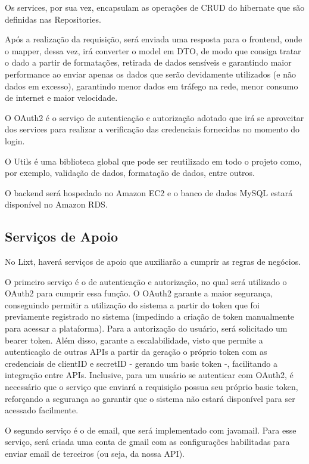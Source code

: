 Os services, por sua vez, encapsulam as operações de CRUD do hibernate que são definidas nas Repositories.

Após a realização da requisição, será enviada uma resposta para o frontend, onde o mapper, dessa vez, irá converter o model em DTO, de modo que consiga tratar o dado a partir de formatações, retirada de dados sensíveis e garantindo maior performance ao enviar apenas os dados que serão devidamente utilizados (e não dados em excesso), garantindo menor dados em tráfego na rede, menor consumo de internet e maior velocidade.

O OAuth2 é o serviço de autenticação e autorização adotado que irá se aproveitar dos services para realizar a verificação das credenciais fornecidas no momento do login.

O Utils é uma biblioteca global que pode ser reutilizado em todo o projeto como, por exemplo, validação de dados, formatação de dados, entre outros.

O backend será hospedado no Amazon EC2 e o banco de dados MySQL estará disponível no Amazon RDS.

\subsection{Serviços de Apoio}

No Lixt, haverá serviços de apoio que auxiliarão a cumprir as regras de negócios. 

O primeiro serviço é o de autenticação e autorização, no qual será utilizado o OAuth2 para cumprir essa função. O OAuth2 garante a maior segurança, conseguindo permitir a utilização do sistema a partir do token que foi previamente registrado no sistema (impedindo a criação de token manualmente para acessar a plataforma). Para a autorização do usuário, será solicitado um bearer token. Além disso, garante a escalabilidade, visto que permite a autenticação de outras APIs a partir da geração o próprio token com as credenciais de clientID e secretID - gerando um basic token -, facilitando a integração entre APIs. Inclusive, para um uusário se autenticar com OAuth2, é necessário que o serviço que enviará a requisição possua seu próprio basic token, reforçando a segurança ao garantir que o sistema não estará disponível para ser acessado facilmente.

O segundo serviço é o de email, que será implementado com javamail. Para esse serviço, será criada uma conta de gmail com as configurações habilitadas para enviar email de terceiros (ou seja, da nossa API).
